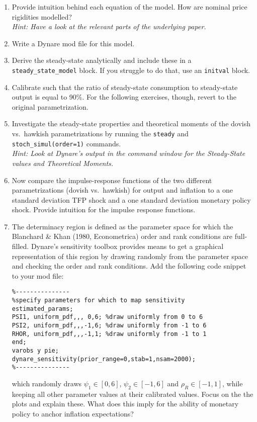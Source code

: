 \documentclass{article}
\begin{document}
\begin{enumerate}

\item
Provide intuition behind each equation of the model. How are nominal price rigidities modelled?\\\emph{Hint: Have a look at the relevant parts of the underlying paper.}

\item
Write a Dynare mod file for this model.

\item
Derive the steady-state analytically and include these in a {\texttt{steady{\_}state{\_}model}} block.
If you struggle to do that, use an \texttt{initval} block.

\item
Calibrate such that the ratio of steady-state consumption to steady-state output is equal to 90\%.
For the following exercises, though, revert to the original parametrization.		

\item
Investigate the steady-state properties and theoretical moments of the dovish vs.\ hawkish parametrizations
  by running the \texttt{steady} and \texttt{stoch{\_}simul{(order=1)}} commands.\\
  \emph{Hint: Look at Dynare's output in the command window for the Steady-State values and Theoretical Moments.}

\item
Now compare the impulse-response functions of the two different parametrizations (dovish vs.\ hawkish) for output and inflation
  to a one standard deviation TFP shock and a one standard deviation monetary policy shock.
Provide intuition for the impulse response functions.

\item
The determinacy region is defined as the parameter space for which the Blanchard \& Khan (1980, Econometrica) order and rank conditions are full-filled.
Dynare's sensitivity toolbox provides means to get a graphical representation of this region by drawing randomly from the parameter space and checking the order and rank conditions.
Add the following code snippet to your mod file:
\begin{verbatim}
%---------------
%specify parameters for which to map sensitivity
estimated_params;
PSI1, uniform_pdf,,, 0,6; %draw uniformly from 0 to 6
PSI2, uniform_pdf,,,-1,6; %draw uniformly from -1 to 6
RHOR, uniform_pdf,,,-1,1; %draw uniformly from -1 to 1
end;
varobs y pie;
dynare_sensitivity(prior_range=0,stab=1,nsam=2000);
%---------------
\end{verbatim}	
which randomly draws \(\psi_1 \in [0,6]\), \(\psi_2 \in [-1,6]\) and \(\rho_R \in [-1,1]\), while keeping all other parameter values at their calibrated values.
Focus on the the plots and explain these.
What does this imply for the ability of monetary policy to anchor inflation expectations?


\end{enumerate}
\end{document}
